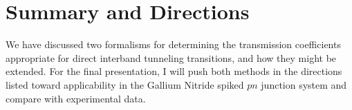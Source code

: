 \section{Summary and Directions}
We have discussed two formalisms for determining the transmission coefficients appropriate for direct interband tunneling transitions, and how they might be extended.  For the final presentation, I will push both methods in the directions listed toward applicability in the Gallium Nitride spiked $pn$ junction system and compare with experimental data.